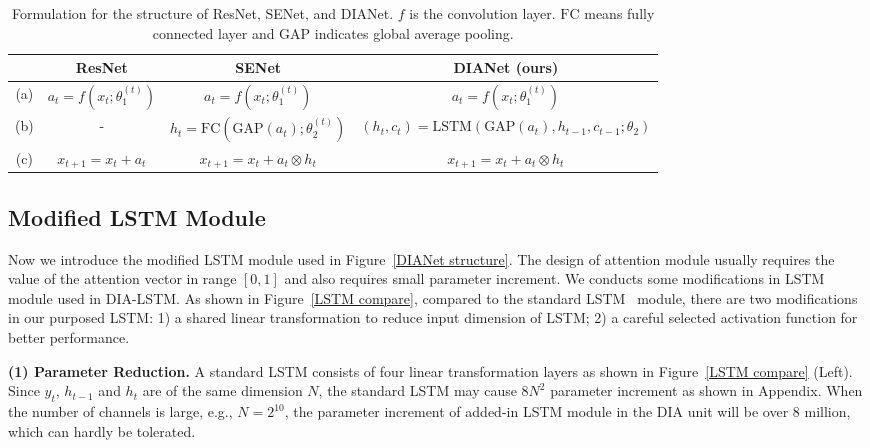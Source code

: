 \documentclass[letterpaper]{article} \usepackage{aaai20}  \usepackage{times}  \usepackage{helvet} \usepackage{courier}  \usepackage[hyphens]{url}  \usepackage{graphicx} \urlstyle{rm} \def\UrlFont{\rm}  \usepackage{graphicx}  \frenchspacing  \setlength{\pdfpagewidth}{8.5in}  \setlength{\pdfpageheight}{11in}  \usepackage{color}
\begin{document}
	\begin{table*}[htbp]
		\small
		\centering
		\begin{tabular}{|c|c|c|c|}
			\toprule
			&    ResNet   &  SENet     & DIANet (ours) \\
			\midrule
			(a)  &  $a_t = f(x_t;\theta_{1}^{(t)})$ & $a_t = f(x_t;\theta_{1}^{(t)})$ & $a_t = f(x_t;\theta_{1}^{(t)})$  \\
			(b)  &    -   &   $h_t = \text{FC}(\text{GAP}(a_t);\theta_{2}^{(t)})$    &  $(h_t,c_t) = \text{LSTM}(\text{GAP}(a_t), h_{t-1},c_{t-1};\theta_{2})$\\
			(c) & $x_{t+1} = x_t + a_t$      &    $x_{t+1} = x_t + a_t \otimes h_t$   & $x_{t+1} = x_t + a_t \otimes h_t$ \\
			\bottomrule
		\end{tabular}\caption{Formulation for the structure of ResNet, SENet, and DIANet. $f$ is the convolution layer. $\text{FC}$ means fully connected layer and $\text{GAP}$ indicates global average pooling. }
		\label{DIANet compare SENet}\end{table*}

	\subsection{Modified LSTM Module}
	\label{sec:lstm}
	Now we introduce the modified LSTM module used in Figure~\ref{DIANet structure}. The design of attention module usually requires the value of the attention vector in range $[0,1]$ and also requires small parameter increment. We conducts some modifications in LSTM module used in DIA-LSTM. As shown in Figure~\ref{LSTM compare}, compared to the standard LSTM~\cite{hochreiter1997long} module, there are two modifications in our purposed LSTM: 1) a shared linear transformation to reduce input dimension of LSTM; 2) a careful selected activation function for better performance. 
	
	\noindent\textbf{(1) Parameter Reduction.} A standard LSTM consists of four linear transformation layers as shown in Figure~\ref{LSTM compare} (Left). Since $y_{t}$, $h_{t-1}$ and $h_{t}$ are of the same dimension $N$, the standard LSTM may cause $8N^2$ parameter increment as shown in Appendix. When the number of channels is large, e.g., $N=2^{10}$, the parameter increment of added-in LSTM module in the DIA unit will be over 8 million, which can hardly be tolerated. 
	
\end{document}
